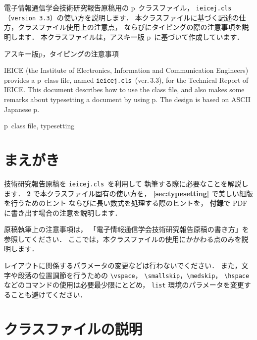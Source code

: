 \documentclass[technicalreport]{ieicej}
\def\IEICEJcls{\texttt{ieicej.cls}}
\def\IEICEJver{3.3}
\begin{document}
\begin{jabstract}
電子情報通信学会技術研究報告原稿用の p\LaTeXe\ クラスファイル，
\IEICEJcls{}（\texttt{version \IEICEJver}）の使い方を説明します．
本クラスファイルに基づく記述の仕方，クラスファイル使用上の注意点，
ならびにタイピングの際の注意事項を説明します．
本クラスファイルは，アスキー版 p\LaTeXe\ に基づいて作成しています．
\end{jabstract}
\begin{jkeyword}
アスキー版p\LaTeXe{}，タイピングの注意事項
\end{jkeyword}
\begin{eabstract}
IEICE (the Institute of Electronics, Information 
and Communication Engineers) provides 
a p\LaTeXe\ class file, named \IEICEJcls\ (ver.\,\IEICEJver), 
for the Technical Report of IEICE. 
This document describes how to use the class file, 
and also makes some remarks about typesetting a document by using p\LaTeXe. 
The design is based on ASCII Japanese p\LaTeXe. 
\end{eabstract}
\begin{ekeyword}
p\LaTeXe\ class file, typesetting
\end{ekeyword}
\maketitle

\section{まえがき}

技術研究報告原稿を \IEICEJcls\ を利用して
執筆する際に必要なことを解説します．
{\bfseries \ref{sec:cls}} で本クラスファイル固有の使い方を，
{\bfseries \ref{sec:typesetting}} で美しい組版を行うためのヒント
ならびに長い数式を処理する際のヒントを，
{\bfseries 付録}で PDF に書き出す場合の注意を説明します．

原稿執筆上の注意事項は，
「電子情報通信学会技術研究報告原稿の書き方」を参照してください．
ここでは，本クラスファイルの使用にかかわる点のみを説明します．

レイアウトに関係するパラメータの変更などは行わないでください．
また，文字や段落の位置調節を行うための \verb/\vspace/，
\verb/\smallskip/，\verb/\medskip/，
\verb/\hspace/ などのコマンドの使用は必要最少限にとどめ，
\texttt{list} 環境のパラメータを変更することも避けてください．

\section{クラスファイルの説明}
\label{sec:cls}
\end{document}
